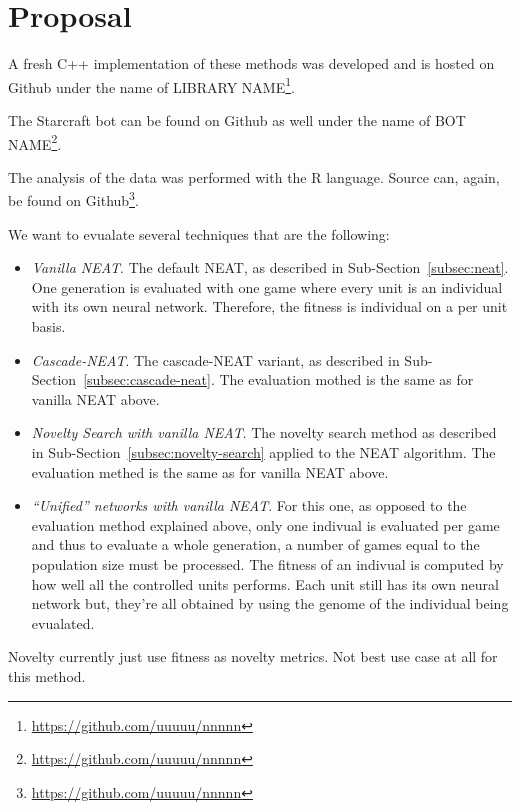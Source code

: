 \section{Proposal}\label{section:proposal}

A fresh C++ implementation of these methods was developed and is hosted on Github under the name of LIBRARY
NAME\footnote{\url{https://github.com/uuuuu/nnnnn}}.%

The Starcraft bot can be found on Github as well under the name of
BOT NAME\footnote{\url{https://github.com/uuuuu/nnnnn}}.%

The analysis of the data was performed with the R language. Source can, again,
be found on Github\footnote{\url{https://github.com/uuuuu/nnnnn}}.%

We want to evualate several techniques that are the following:
\begin{itemize}
    \item \emph{Vanilla NEAT}. The default NEAT, as described in Sub-Section~\ref{subsec:neat}. One generation is evaluated with one game
        where every unit is an individual with its own neural network. Therefore, the fitness is individual on a per unit basis.
    \item \emph{Cascade-NEAT}. The cascade-NEAT variant, as described in Sub-Section~\ref{subsec:cascade-neat}.
        The evaluation mothed is the same as for vanilla NEAT above.
    \item \emph{Novelty Search with vanilla NEAT}. The novelty search method as described in Sub-Section~\ref{subsec:novelty-search} applied to the NEAT algorithm.
        The evaluation methed is the same as for vanilla NEAT above.
    \item \emph{``Unified'' networks with vanilla NEAT}. For this one, as opposed to the evaluation method explained above, only one indivual is
        evaluated per game and thus to evaluate a whole generation, a number of games equal to the population size must be processed.
        The fitness of an indivual is computed by how well all the controlled units performs. Each unit still has its own neural network
        but, they're all obtained by using the genome of the individual being evualated.
\end{itemize}


Novelty currently just use fitness as novelty metrics. Not best use case at
all for this method.
